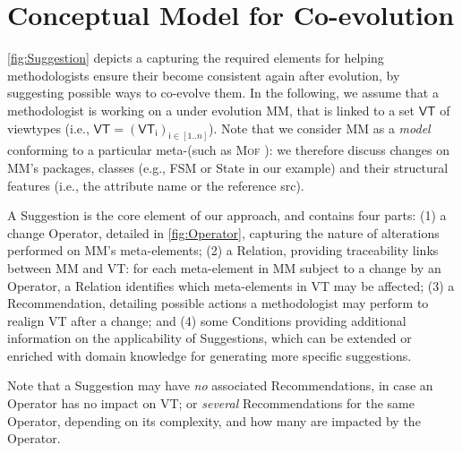 \section{Conceptual Model for \Viewtype Co-evolution}
\label{sec:Suggestion}

\cref{fig:Suggestion} depicts a \metamodel capturing the
required elements for helping methodologists ensure their \viewtypes become consistent again after \metamodel evolution,
by suggesting possible ways to co-evolve them.
In the following, we assume that a methodologist is working on a \metamodel
under evolution \textsf{MM}, that is linked to a set $\mathsf{VT}$ of viewtypes
(i.e., $\mathsf{VT} = (\mathsf{VT}_\mathsf{i})_{\mathsf{i}\in [1..n]}$). Note that
we consider \textsf{MM} as a \emph{model}
conforming to a particular meta-\metamodel (such as \textsc{Mof} \cite{TR:OMG-MOF:2016}):
we therefore discuss changes on \textsf{MM}'s packages, classes (e.g., 
\textsf{FSM} or \textsf{State} in our example) and their structural features
(i.e., the attribute \textsf{name} or the reference \textsf{src}).

A \textsf{Suggestion} is the core element of our approach, and contains four 
parts: (1) a change \textsf{Operator}, detailed in \cref{fig:Operator}, 
capturing the nature of alterations performed on \textsf{MM}'s meta-elements; 
(2) a \textsf{Relation}, providing traceability links between \textsf{MM} 
and \textsf{VT}: for each meta-element in \textsf{MM} subject to a 
change by an \textsf{Operator}, a \textsf{Relation} identifies which 
meta-elements in \textsf{VT} may be affected;
(3) a \textsf{Recommendation}, detailing possible actions a methodologist 
may perform to realign \textsf{VT} after a change; and 
(4) some \textsf{Condition}s providing additional information on the applicability
of \textsf{Suggestion}s, which can be extended or enriched with domain knowledge
for generating more specific suggestions.


Note that a \textsf{Suggestion} may 
have \emph{no} associated \textsf{Recommendation}s, in case an \textsf{Operator} has no
impact on \textsf{VT}; or \emph{several} \textsf{Recommendation}s for the same 
\textsf{Operator}, depending on its complexity, and how many \viewtypes are impacted by the \textsf{Operator}.

